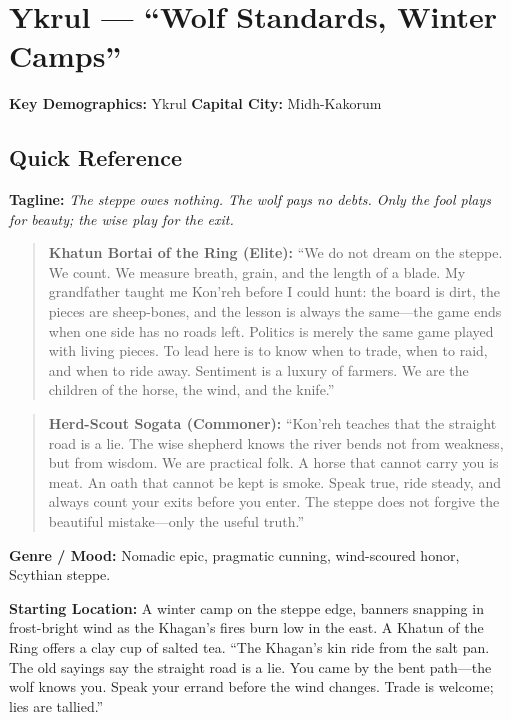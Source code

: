 \section{Ykrul --- ``Wolf Standards, Winter Camps''}
\label{chap:ykrul}

\textbf{Key Demographics: } Ykrul
\textbf{Capital City: } Midh-Kakorum

\subsection*{Quick Reference}

\textbf{Tagline:} \textit{The steppe owes nothing. The wolf pays no debts. Only the fool plays for beauty; the wise play for the exit.}

\begin{quote}
  \textbf{Khatun Bortai of the Ring (Elite):}  
  ``We do not dream on the steppe. We count. We measure breath, grain, and the length of a blade. My grandfather taught me Kon'reh before I could hunt: the board is dirt, the pieces are sheep-bones, and the lesson is always the same---the game ends when one side has no roads left. Politics is merely the same game played with living pieces. To lead here is to know when to trade, when to raid, and when to ride away. Sentiment is a luxury of farmers. We are the children of the horse, the wind, and the knife.''
\end{quote}

\begin{quote}
  \textbf{Herd-Scout Sogata (Commoner):}  
  ``Kon'reh teaches that the straight road is a lie. The wise shepherd knows the river bends not from weakness, but from wisdom. We are practical folk. A horse that cannot carry you is meat. An oath that cannot be kept is smoke. Speak true, ride steady, and always count your exits before you enter. The steppe does not forgive the beautiful mistake---only the useful truth.''
\end{quote}

\noindent\textbf{Genre / Mood:} Nomadic epic, pragmatic cunning, wind-scoured honor, Scythian steppe.

\noindent\textbf{Starting Location:} A winter camp on the steppe edge, banners snapping in frost-bright wind as the Khagan's fires burn low in the east. A Khatun of the Ring offers a clay cup of salted tea. ``The Khagan's kin ride from the salt pan. The old sayings say the straight road is a lie. You came by the bent path---the wolf knows you. Speak your errand before the wind changes. Trade is welcome; lies are tallied.''

